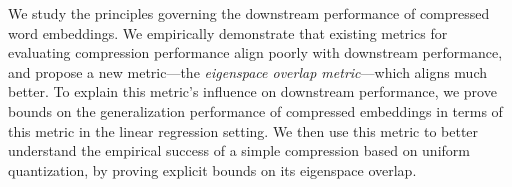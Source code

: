 We study the principles governing the downstream performance of compressed word embeddings.
We empirically demonstrate that existing metrics for evaluating compression performance align poorly with downstream performance, and propose a new metric---the \textit{eigenspace overlap metric}---which aligns much better.
To explain this metric's influence on downstream performance, we prove bounds on the generalization performance of compressed embeddings in terms of this metric in the linear regression setting.
We then use this metric to better understand the empirical success of a simple compression based on uniform quantization, by proving explicit bounds on its eigenspace overlap.


%
%
%
%
%
%
%






